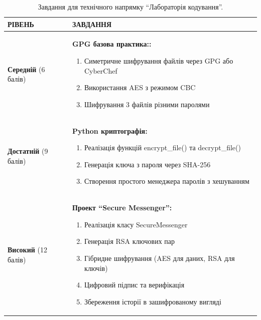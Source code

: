 \begin{table}[h!]
\caption{Завдання для технічного напрямку ``Лабораторія кодування''.}
\label{tab:lab2_tech_task} %
\noindent %

\begin{tabular}{
  | >{\raggedright\arraybackslash}p{} 
  | >{\raggedright\arraybackslash}p{} |
}
\hline

\rowcolor{TableHeaderBlue}
\hfil\color{white}\textbf{РІВЕНЬ} & 
\hfil\color{white}\textbf{ЗАВДАННЯ} \\ \hline

\cellcolor{TableBodyGreen}
\textbf{Середній} (6 балів) &
\textbf{GPG базова практика::}
\begin{enumerate}
    \item Симетричне шифрування файлів через GPG або CyberChef
    \item Використання AES з режимом CBC
    \item Шифрування 3 файлів різними паролями
\end{enumerate}
\\ \hline

\cellcolor{TableBodyGreen}
\textbf{Достатній} (9 балів) &
\textbf{Python криптографія:}
\begin{enumerate}
    \item Реалізація функцій encrypt\_file() та decrypt\_file()
    \item Генерація ключа з пароля через SHA-256
    \item Створення простого менеджера паролів з хешуванням
\end{enumerate} \\ \hline

\cellcolor{TableBodyGreen}
\textbf{Високий} (12 балів) &
\textbf{Проект ``Secure Messenger'':}
\begin{enumerate}
    \item Реалізація класу SecureMessenger
    \item Генерація RSA ключових пар
    \item Гібридне шифрування (AES для даних, RSA для ключів)
    \item Цифровий підпис та верифікація
    \item Збереження історії в зашифрованому вигляді
    
\end{enumerate} \\ \hline

\end{tabular}
\end{table}

